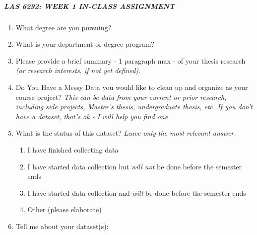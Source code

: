 \documentclass[
]{article}
\author{}
\date{\vspace{-2.5em}}
\providecommand{\tightlist}{%
  \setlength{\itemsep}{0pt}\setlength{\parskip}{0pt}}
\begin{document}
\hypertarget{las-6292-week-1-in-class-assignment}{%
\subparagraph{\texorpdfstring{\emph{LAS 6292: WEEK 1 IN-CLASS ASSIGNMENT
}}{LAS 6292: WEEK 1 IN-CLASS ASSIGNMENT }}\label{las-6292-week-1-in-class-assignment}}

\newline \newline

\begin{enumerate}
\def\labelenumi{\arabic{enumi}.}
\item
  What degree are you pursuing?\\
  \newline \newline
\item
  What is your department or degree program?\\
  \newline \newline  
\item
  Please provide a brief summary - 1 paragraph max - of your thesis
  research \emph{(or research interests, if not yet defined)}.\\
  \newline \newline 
\item
  Do You Have a Messy Data you would like to clean up and organize as
  your course project? \emph{This can be data from your current or prior
  research, including side projects, Master's thesis, undergraduate
  thesis, etc. If you don't have a dataset, that's ok - I will help you
  find one.}\\
  \newline \newline
\item
  What is the status of this dataset? \emph{Leave only the most relevant
  answer.}

  \begin{enumerate}
  \def\labelenumii{\alph{enumii}.}
  \tightlist
  \item
    I have finished collecting data
  \item
    I have started data collection but \emph{will not} be done before
    the semester ends
  \item
    I have started data collection and \emph{will} be done before the
    semester ends
  \item
    Other (please elaborate)\\
    \newline   \newline    
  \end{enumerate}
\item
  Tell me about your dataset(s):


\end{enumerate}
\end{document}
